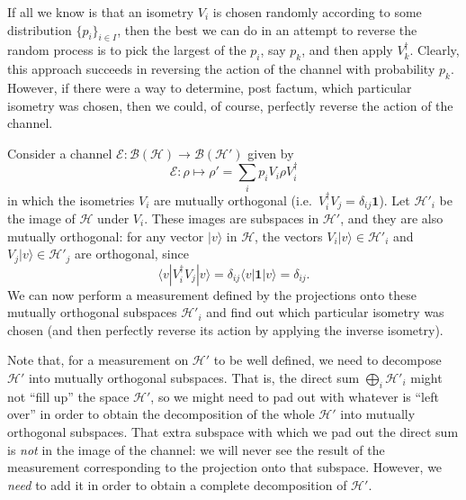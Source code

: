 \documentclass[fleqn]{article}
\begin{document}
If all we know is that an isometry \(V_i\) is chosen randomly according to some distribution \(\{p_i\}_{i\in I}\), then the best we can do in an attempt to reverse the random process is to pick the largest of the \(p_i\), say \(p_k\), and then apply \(V_k^\dagger\).
Clearly, this approach succeeds in reversing the action of the channel with probability \(p_k\).
However, if there were a way to determine, post factum, which particular isometry was chosen, then we could, of course, perfectly reverse the action of the channel.

Consider a channel \(\mathcal{E}\colon\mathcal{B}(\mathcal{H})\to\mathcal{B}(\mathcal{H}')\) given by
\[
  \mathcal{E}\colon\rho
  \longmapsto \rho'
  = \sum_i p_i V_i\rho V^\dagger_i
\]
in which the isometries \(V_i\) are mutually orthogonal (i.e.~\(V_i^\dagger V_j =\delta_{ij}\mathbf{1}\)).
Let \(\mathcal{H}'_i\) be the image of \(\mathcal{H}\) under \(V_i\).
These images are subspaces in \(\mathcal{H}'\), and they are also mutually orthogonal: for any vector \(|v\rangle\) in \(\mathcal{H}\), the vectors \(V_i|v\rangle\in \mathcal{H}'_i\) and \(V_j|v\rangle\in \mathcal{H}'_j\) are orthogonal, since
\[
  \langle v|V_i^\dagger V_j|v\rangle
  = \delta_{ij} \langle v|\mathbf{1}|v\rangle
  = \delta_{ij}.
\]
We can now perform a measurement defined by the projections onto these mutually orthogonal subspaces \(\mathcal{H}'_i\) and find out which particular isometry was chosen (and then perfectly reverse its action by applying the inverse isometry).

Note that, for a measurement on \(\mathcal{H}'\) to be well defined, we need to decompose \(\mathcal{H}'\) into mutually orthogonal subspaces.
That is, the direct sum \(\bigoplus_i\mathcal{H}'_i\) might not ``fill up'' the space \(\mathcal{H}'\), so we might need to pad out with whatever is ``left over'' in order to obtain the decomposition of the whole \(\mathcal{H}'\) into mutually orthogonal subspaces.
That extra subspace with which we pad out the direct sum is \emph{not} in the image of the channel: we will never see the result of the measurement corresponding to the projection onto that subspace.
However, we \emph{need} to add it in order to obtain a complete decomposition of \(\mathcal{H}'\).
\end{document}
